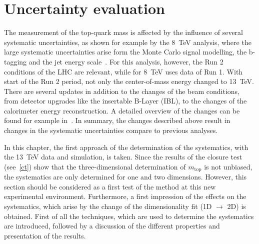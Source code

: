 \chapter{Uncertainty evaluation}
\label{sec:Uns}
The measurement of the top-quark mass is affected by the influence of several systematic uncertainties, as shown for example by the 8~TeV analysis, where the large systematic uncertainties arise form the Monte Carlo signal modelling, the b-tagging and the jet energy scale~\cite{ATLAS-CONF-2017-071}.  For this analysis, however, the Run 2 conditions of the LHC are relevant, while for 8~TeV uses data of Run 1. With start of the Run 2 period, not only the center-of-mass energy  changed to 13~TeV. There are several updates in addition to the changes of the beam conditions, from  detector upgrades like the  insertable B-Layer (IBL), to the changes of the calorimeter energy reconstruction. A detailed overview of the changes can be found for example in~\cite{ATL-PHYS-PUB-2015-015}. In summary, 
the changes described above result in changes in the systematic uncertainties compare to previous analyses. 

In this chapter, the first approach of the determination of  the systematics, with the 13~TeV data and simulation, is taken. 
Since the results of the closure test (see~\cref{ct}) show that the three-dimensional determination of $m_{\text{top}}$ is not unbiased, the systematics are only determined for one and two dimensions. 
However, this section should be considered as a first test of the method at this new experimental environment.
Furthermore, a first impression of the effects on the systematics, which arise by the change  of the dimensionality  fit (1D $\rightarrow$ 2D) is obtained.
First of all the techniques, which are used to determine the systematics are introduced, followed by a discussion of the different properties and presentation of the results.   






